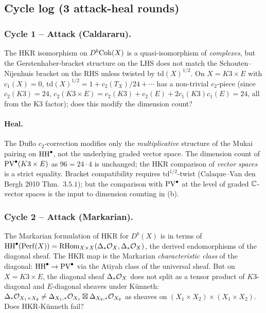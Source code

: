 \subsection*{Cycle log (3 attack-heal rounds)}

\subsubsection*{Cycle 1 -- Attack (Caldararu).}
The HKR isomorphism on $D^b\mathrm{Coh}(X)$ is a quasi-isomorphism of
\emph{complexes}, but the Gerstenhaber-bracket structure on the LHS
does not match the Schouten--Nijenhuis bracket on the RHS unless
twisted by $\mathrm{td}(X)^{1/2}$. On $X = K3\times E$ with $c_1(X) = 0$,
$\mathrm{td}(X)^{1/2} = 1 + c_2(T_X)/24 + \cdots$ has a non-trivial
$c_2$-piece (since $c_2(K3) = 24$, $c_2(K3\times E) = c_2(K3) +
c_2(E) + 2c_1(K3)c_1(E) = 24$, all from the K3 factor); does this
modify the dimension count?

\paragraph{Heal.}
The Duflo $c_2$-correction modifies only the \emph{multiplicative}
structure of the Mukai pairing on $\mathrm{HH}^\bullet$, not the underlying
graded vector space. The dimension count of $\mathrm{PV}^\bullet(K3\times E)$
as $96 = 24\cdot 4$ is unchanged; the HKR comparison of
\emph{vector spaces} is a strict equality. Bracket compatibility
requires $\mathrm{td}^{1/2}$-twist (Calaque--Van den Bergh 2010
Thm.~$3.5.1$); but the comparison with $\mathrm{PV}^\bullet$ at the level of
graded $\mathbb{C}$-vector spaces is the input to dimension counting in (b).

\subsubsection*{Cycle 2 -- Attack (Markarian).}
The Markarian formulation of HKR for $D^b(X)$ is in terms of
$\mathrm{HH}^\bullet(\mathrm{Perf}(X)) = \mathrm{RHom}_{X\times X}(\Delta_*\mathcal{O}_X,
\Delta_*\mathcal{O}_X)$, the derived endomorphisms of the diagonal sheaf.
The HKR map is the Markarian \emph{characteristic class} of the
diagonal: $\mathrm{HH}^\bullet \to \mathrm{PV}^\bullet$ via the Atiyah class of the
universal sheaf. But on $X = K3\times E$, the diagonal sheaf
$\Delta_*\mathcal{O}_X$ does not split as a tensor product of $K3$-diagonal
and $E$-diagonal sheaves under K\"unneth: $\Delta_*\mathcal{O}_{X_1\times X_2}
\neq \Delta_{X_1,*}\mathcal{O}_{X_1}\boxtimes\Delta_{X_2,*}\mathcal{O}_{X_2}$ as
sheaves on $(X_1\times X_2)\times(X_1\times X_2)$. Does HKR-K\"unneth
fail?

